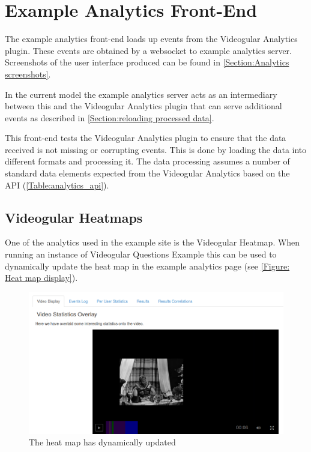 \section{Example Analytics Front-End}

The example analytics front-end loads up events from the \gls{Videogular} Analytics plugin. These events are obtained by a websocket to example analytics server. Screenshots of the user interface produced can be found in \autoref{Section:Analytics screenshots}.

In the current model the example analytics server acts as an intermediary between this and the \gls{Videogular} Analytics plugin that can serve additional events as described in \autoref{Section:reloading processed data}.

This front-end tests the \gls{Videogular} Analytics plugin to ensure that the data received is not missing or corrupting events. This is done by loading the data into different formats and processing it. The data processing assumes a number of standard data elements expected from the Videogular Analytics based on the \gls{API} (\autoref{Table:analytics_api}).

\subsection{Videogular Heatmaps}
\label{Subsubsection:Videogular Heatmaps in example}

One of the analytics used in the example site is the \gls{Videogular} Heatmap. When running an instance of \gls{Videogular} Questions Example this can be used to dynamically update the heat map in the example analytics page (see \autoref{Figure: Heat map display}).

\begin{figure}[h]
	\centering
		\includegraphics[scale=0.4]{../figures/heatmapDisplay.png}
	\caption{\label{Figure: Heat map display} The heat map has dynamically updated}
\end{figure}


